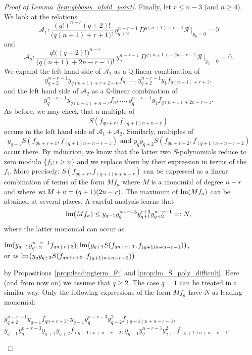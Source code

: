 \begin{proof}[Proof of Lemma~\ref{lem:gbbasis_nfold_point}]
\vspace{1mm}

Finally, let $r\leq n-3$ (and $n\geq 4$). We look at the relations
\[ \mathcal{A}_1 : \frac{(q!)^{n-r} (q+2)!}{\bigl(q(n+1) +r+1 \bigr)!} \, y_{q+2}^{n-r-1} \, D^{q(n+1)+r+1} \mathcal{R} \, \bigr|_{y_0=0} = 0 \]
and
\[ \mathcal{A}_2 : \frac{ q! \bigl((q+2)!\bigr)^{n-r} }{\bigl( q(n+1) + 2n - r - 1 \bigr)!} \,  y_{q}^{n-r-1} \,  D^{q(n+1) + 2n - r - 1 }\mathcal{R}\, \bigr|_{y_0=0} = 0.    \]
We expand the left hand side of $\mathcal{A}_1$ as a $\mathbb{Q}$-linear combination of
\[ y_{q+2}^{n-r-1} y_{ q(n+1) + r + 2 - n } f_n , \ldots , y_{q+2}^{n-r-1} y_{1} f_{q (n+1)+ r + 1},  \]
and the left hand side of $\mathcal{A}_2$ as a $\mathbb{Q}$-linear combination of
\[ y_{q}^{n-r-1} y_{ q(n+1) + n-r } f_n , \ldots , y_{q}^{n-r-1} y_{1} f_{ q(n+1) + 2n - r - 1  }.  \]
As before, we may check that a multiple of 
\[ S(f_{qn+r},f_{(q+1)n+n-r}) \]
occurs in the left hand side of $\mathcal{A}_1 + \mathcal{A}_2$. Similarly, multiples of
\[  y_{q+1}S(f_{qn+r+1},f_{(q+1)n+n-r-1}) \text{ and } y_qy_{q+2}S(f_{qn+r+2},f_{(q+1)n+n-r-2}) \] 
occur there. By induction, we know that the latter two $S$-polynomials reduce to zero modulo $\{f_i;i\geq n\}$ and we replace them by their expression in terms of the $f_i$. More precisely: $S(f_{qn+r},f_{(q+1)n+n-r})$ can be expressed as a linear combination of terms of the form $M f_{a}$ where $M$ is a monomial of degree $n-r$ and where $\textnormal{wt}\, M + a = (q+1)(2n-r)$. The maximum of $\textnormal{lm}(Mf_a)$ can be attained at several places. A careful analysis learns that
\[ \textnormal{lm}(M f_a) \leq y_{q-1}y_q^{n-r-3}y_{q+1}^{r+3}y_{q+2}^{n-r-1} =: N, \] 
where the latter monomial can occur as
\begin{center}
 $\textnormal{lm}(y_{q-1}y_{q+2}^{n-r-1}f_{qn+r+3}), \textnormal{lm}\bigl(y_{q+1}S(f_{qn+r+1},f_{(q+1)n+n-r-1})\bigr)$, \\ 
 or as $\textnormal{lm}\bigl(y_qy_{q+2}S(f_{qn+r+2},f_{(q+1)n+n-r-2})\bigr)$
\end{center}
by Propositions~\ref{prop:leadingterm_Fi} and \ref{prop:lm_S_poly_difficult}. Here (and from now on) we assume that $q\geq 2$. The case $q=1$ can be treated in a similar way. Only the following expressions of the form $Mf_a$ have $N$ as leading monomial:
\begin{center}
 $y_{q+2}^{n-r-1}y_{q-1}f_{qn+r+3}, y_{q-1}y_q^{n-r-3}y_{q+2}^2 f_{(q+1)n+n-r-3}$, \\
 $ y_{q-1}y_q^{n-r-3}y_{q+1}y_{q+2} f_{(q+1)n+n-r-2}, y_{q-1}y_q^{n-r-3}y_{q+1}^2f_{(q+1)n+n-r-1}$.
\end{center}

\end{proof}
